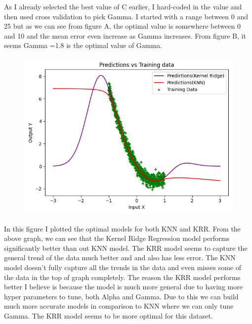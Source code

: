 \documentclass[11pt]{article} %
\begin{document}
As I already selected the best value of C earlier, I hard-coded in the value and then used cross validation to pick Gamma. I started with a range between 0 and 25 but as we can see from figure A, the optimal value is somewhere between 0 and 10 and the mean error even increase as Gamma increases. From figure B, it seems Gamma =1.8 is the optimal value of Gamma.\\
\clearpage
\begin{figure}[h]
\centering
\includegraphics[scale=0.7]{knvkr.png}
\end{figure}
In this figure I plotted the optimal models for both KNN and KRR. From the above graph, we can see that the Kernel Ridge Regression model performs significantly better than out KNN model. The KRR model seems to capture the general trend of the data much better and and also has less error. The KNN model doesn't fully capture all the trends in the data and even misses some of the data in the top of graph completely. The reason the KRR model performs better I believe is because the model is much more general due to having more hyper parameters to tune, both Alpha and Gamma. Due to this we can build much more accurate models in comparison to KNN where we can only tune Gamma. The KRR model seems to be more optimal for this dataset.
\end{document}
